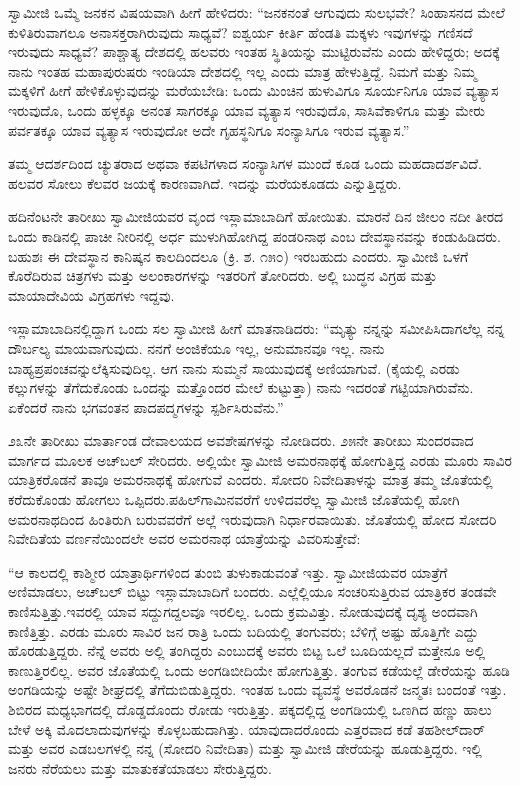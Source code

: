  ಸ್ವಾಮೀಜಿ ಒಮ್ಮೆ ಜನಕನ ವಿಷಯವಾಗಿ ಹೀಗೆ ಹೇಳಿದರು: “ಜನಕನಂತೆ ಆಗುವುದು ಸುಲಭವೇ? ಸಿಂಹಾಸನದ ಮೇಲೆ ಕುಳಿತಿರುವಾಗಲೂ ಅನಾಸಕ್ತರಾಗಿರುವುದು ಸಾಧ್ಯವೆ? ಐಶ್ವರ್ಯ ಕೀರ್ತಿ ಹೆಂಡತಿ ಮಕ್ಕಳು ಇವುಗಳನ್ನು ಗಣಿಸದೆ ಇರುವುದು ಸಾಧ್ಯವೆ? ಪಾಶ್ಚಾತ್ಯ ದೇಶದಲ್ಲಿ ಹಲವರು ಇಂತಹ ಸ್ಥಿತಿಯನ್ನು ಮುಟ್ಟಿರುವೆನು ಎಂದು ಹೇಳಿದ್ದರು; ಅದಕ್ಕೆ ನಾನು ಇಂತಹ ಮಹಾಪುರುಷರು ಇಂಡಿಯಾ ದೇಶದಲ್ಲಿ ಇಲ್ಲ ಎಂದು ಮಾತ್ರ ಹೇಳುತ್ತಿದ್ದೆ. ನಿಮಗೆ ಮತ್ತು ನಿಮ್ಮ ಮಕ್ಕಳಿಗೆ ಹೀಗೆ ಹೇಳಿಕೊಳ್ಳುವುದನ್ನು ಮರೆಯಬೇಡಿ: ಒಂದು ಮಿಂಚಿನ ಹುಳುವಿಗೂ ಸೂರ್ಯನಿಗೂ ಯಾವ ವ್ಯತ್ಯಾಸ ಇರುವುದೊ, ಒಂದು ಹಳ್ಳಕ್ಕೂ ಅನಂತ ಸಾಗರಕ್ಕೂ ಯಾವ ವ್ಯತ್ಯಾಸ ಇರುವುದೊ, ಸಾಸಿವೆಕಾಳಿಗೂ ಮತ್ತು ಮೇರು ಪರ್ವತಕ್ಕೂ ಯಾವ ವ್ಯತ್ಯಾಸ ಇರುವುದೋ ಅದೇ ಗೃಹಸ್ಥನಿಗೂ ಸಂನ್ಯಾಸಿಗೂ ಇರುವ ವ್ಯತ್ಯಾಸ.”‌ 

 ತಮ್ಮ ಆದರ್ಶದಿಂದ ಚ್ಯುತರಾದ ಅಥವಾ ಕಪಟಿಗಳಾದ ಸಂನ್ಯಾಸಿಗಳ ಮುಂದೆ ಕೂಡ ಒಂದು ಮಹದಾದರ್ಶವಿದೆ. ಹಲವರ ಸೋಲು ಕೆಲವರ ಜಯಕ್ಕೆ ಕಾರಣವಾಗಿದೆ. ಇದನ್ನು ಮರೆಯಕೂಡದು ಎನ್ನುತ್ತಿದ್ದರು. 

 ಹದಿನೆಂಟನೇ ತಾರೀಖು ಸ್ವಾಮೀಜಿಯವರ ವೃಂದ ಇಸ್ಲಾಮಾಬಾದಿಗೆ ಹೋಯಿತು. ಮಾರನೆ ದಿನ ಜೀಲಂ ನದೀ ತೀರದ ಒಂದು ಕಾಡಿನಲ್ಲಿ ಪಾಚೀ ನೀರಿನಲ್ಲಿ ಅರ್ಧ ಮುಳುಗಿಹೋಗಿದ್ದ ಪಂಡರಿನಾಥ ಎಂಬ ದೇವಸ್ಥಾನವನ್ನು ಕಂಡುಹಿಡಿದರು. ಬಹುಶಃ ಈ ದೇವಸ್ಥಾನ ಕಾನಿಷ್ಕನ ಕಾಲದಿಂದಲೂ (ಕ್ರಿ. ಶ. ೧೫೦) ಇರಬಹುದು ಎಂದರು. ಸ್ವಾಮೀಜಿ ಒಳಗೆ ಕೊರೆದಿರುವ ಚಿತ್ರಗಳು ಮತ್ತು ಅಲಂಕಾರಗಳನ್ನು ಇತರರಿಗೆ ತೋರಿದರು. ಅಲ್ಲಿ ಬುದ್ಧನ ವಿಗ್ರಹ ಮತ್ತು ಮಾಯಾದೇವಿಯ ವಿಗ್ರಹಗಳು ಇದ್ದವು. 

 ಇಸ್ಲಾಮಾಬಾದಿನಲ್ಲಿದ್ದಾಗ ಒಂದು ಸಲ ಸ್ವಾಮೀಜಿ ಹೀಗೆ ಮಾತನಾಡಿದರು: “ಮೃತ್ಯು ನನ್ನನ್ನು ಸಮೀಪಿಸಿದಾಗಲೆಲ್ಲ ನನ್ನ ದೌರ್ಬಲ್ಯ ಮಾಯವಾಗುವುದು. ನನಗೆ ಅಂಜಿಕೆಯೂ ಇಲ್ಲ, ಅನುಮಾನವೂ‌ ಇಲ್ಲ. ನಾನು ಬಾಹ್ಯಪ್ರಪಂಚವನ್ನು\break ಲೆಕ್ಕಿಸುವುದಿಲ್ಲ. ಆಗ ನಾನು ಸುಮ್ಮನೆ ಸಾಯುವುದಕ್ಕೆ ಅಣಿಯಾಗುವೆ. (ಕೈಯಲ್ಲಿ ಎರಡು ಕಲ್ಲುಗಳನ್ನು ತೆಗೆದುಕೊಂಡು ಒಂದನ್ನು ಮತ್ತೊಂದರ ಮೇಲೆ ಕುಟ್ಟುತ್ತಾ) ನಾನು ಇದರಂತೆ ಗಟ್ಟಿಯಾಗಿರುವೆನು. ಏಕೆಂದರೆ ನಾನು ಭಗವಂತನ ಪಾದಪದ್ಮಗಳನ್ನು ಸ್ಪರ್ಶಿಸಿರುವೆನು.” 

 ೨೩ನೇ ತಾರೀಖು ಮಾರ್ತಾಂಡ ದೇವಾಲಯದ ಅವಶೇಷಗಳನ್ನು ನೋಡಿದರು. ೨೫ನೇ ತಾರೀಖು ಸುಂದರವಾದ ಮಾರ್ಗದ ಮೂಲಕ ಅಚ್‍ಬಲ್ ಸೇರಿದರು. ಅಲ್ಲಿಯೇ ಸ್ವಾಮೀಜಿ ಅಮರನಾಥಕ್ಕೆ ಹೋಗುತ್ತಿದ್ದ ಎರಡು ಮೂರು ಸಾವಿರ ಯಾತ್ರಿಕರೊಡನೆ ತಾವೂ ಅಮರನಾಥಕ್ಕೆ ಹೋಗುವೆ ಎಂದರು. ಸೋದರಿ ನಿವೇದಿತಾಳನ್ನು ಮಾತ್ರ ತಮ್ಮ ಜೊತೆಯಲ್ಲಿ ಕರೆದುಕೊಂಡು ಹೋಗಲು ಒಪ್ಪಿದರು.\break ಪಹಿಲ್‍ಗಾಮಿನವರೆಗೆ ಉಳಿದವರೆಲ್ಲ ಸ್ವಾಮೀಜಿ ಜೊತೆಯಲ್ಲಿ ಹೋಗಿ ಅಮರನಾಥದಿಂದ ಹಿಂತಿರುಗಿ ಬರುವವರೆಗೆ ಅಲ್ಲೆ ಇರುವುದಾಗಿ ನಿರ್ಧಾರವಾಯಿತು. ಜೊತೆಯಲ್ಲಿ ಹೋದ ಸೋದರಿ ನಿವೇದಿತೆಯ ವರ್ಣನೆಯಿಂದಲೇ ಅವರ ಅಮರನಾಥ ಯಾತ್ರೆಯನ್ನು ವಿವರಿಸುತ್ತೇವೆ:

 “ಆ ಕಾಲದಲ್ಲಿ ಕಾಶ್ಮೀರ ಯಾತ್ರಾರ್ಥಿಗಳಿಂದ ತುಂಬಿ ತುಳುಕಾಡುವಂತೆ ಇತ್ತು. ಸ್ವಾಮೀಜಿಯವರ ಯಾತ್ರೆಗೆ ಅಣಿಮಾಡಲು, ಅಚ್‍ಬಲ್ ಬಿಟ್ಟು ಇಸ್ಲಾಮಾಬಾದಿಗೆ ಬಂದರು. ಎಲ್ಲೆಲ್ಲಿಯೂ ಸಂಚರಿಸುತ್ತಿರುವ ಯಾತ್ರಿಕರ ತಂಡವೇ ಕಾಣಿಸುತ್ತಿತ್ತು.\break ಇವರಲ್ಲಿ ಯಾವ ಸದ್ದುಗದ್ದಲವೂ ಇರಲಿಲ್ಲ. ಒಂದು ಕ್ರಮವಿತ್ತು. ನೋಡುವುದಕ್ಕೆ ದೃಶ್ಯ ಅಂದವಾಗಿ ಕಾಣಿತ್ತಿತ್ತು. ಎರಡು ಮೂರು ಸಾವಿರ ಜನ ರಾತ್ರಿ ಒಂದು ಬದಿಯಲ್ಲಿ ತಂಗುವರು; ಬೆಳಿಗ್ಗೆ ಅಷ್ಟು ಹೊತ್ತಿಗೇ ಎದ್ದು ಹೊರಡುತ್ತಿದ್ದರು. ನೆನ್ನೆ ಅವರು ಅಲ್ಲಿ ತಂಗಿದ್ದರು ಎಂಬುದಕ್ಕೆ ಅವರು ಬಿಟ್ಟ ಒಲೆ ಬೂದಿಯಲ್ಲದೆ ಮತ್ತೇನೂ ಅಲ್ಲಿ ಕಾಣುತ್ತಿರಲಿಲ್ಲ. ಅವರ ಜೊತೆಯಲ್ಲಿ ಒಂದು ಅಂಗಡಿಬೀದಿಯೇ ಹೋಗುತ್ತಿತ್ತು. ತಂಗುವ ಕಡೆಯಲ್ಲೆ ಡೇರೆಯನ್ನು ಹೂಡಿ ಅಂಗಡಿಯನ್ನು ಅಷ್ಟೇ ಶೀಘ್ರದಲ್ಲಿ ತೆಗೆದುಬಿಡುತ್ತಿದ್ದರು. ಇಂತಹ ಒಂದು ವ್ಯವಸ್ಥೆ ಅವರೊಡನೆ ಜನ್ಮತಃ ಬಂದಂತೆ ಇತ್ತು. ಶಿಬಿರದ ಮಧ್ಯಭಾಗದಲ್ಲಿ ದೊಡ್ಡದೊಂದು ರೋಡು ಇರುತ್ತಿತ್ತು. ಪಕ್ಕದಲ್ಲಿದ್ದ ಅಂಗಡಿಯಲ್ಲಿ ಒಣಗಿದ ಹಣ್ಣು ಹಾಲು ಬೇಳೆ ಅಕ್ಕಿ ಮೊದಲಾದುವುಗಳನ್ನು ಕೊಳ್ಳಬಹುದಾಗಿತ್ತು. ಯಾವುದಾದರೊಂದು ಎತ್ತರವಾದ ಕಡೆ ತಹಶೀಲ್‍ದಾರ್ ಮತ್ತು ಅವರ ಎಡಬಲಗಳಲ್ಲಿ ನನ್ನ (ಸೋದರಿ ನಿವೇದಿತಾ) ಮತ್ತು ಸ್ವಾಮೀಜಿ ಡೇರೆಯನ್ನು ಹೂಡುತ್ತಿದ್ದರು. ಇಲ್ಲಿ ಜನರು ನೆರೆಯಲು ಮತ್ತು ಮಾತುಕತೆಯಾಡಲು ಸೇರುತ್ತಿದ್ದರು.

